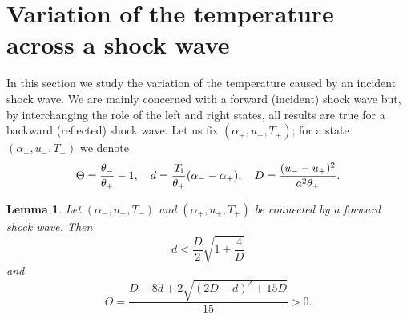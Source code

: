 \documentclass[10pt,a4paper]{article}
\newtheorem{lemma}{Lemma}[section]
\numberwithin{equation}{section}
\newcommand{\Ti}{T_{\rm i}}
\begin{document}
\section{Variation of the temperature across a shock wave}\label{sec:temperature}
In this section we study the variation of the temperature caused by an incident shock wave. We are mainly concerned with a forward (incident) shock wave but, by interchanging the role of the left and right states, all results are true for a backward (reflected) shock wave. Let us fix $(\alpha_+,u_+,T_+)$;
for a state $(\alpha_-,u_-, T_-)$ we denote
\begin{equation}\label{e:ThetaDeltaD}
   \Theta = \frac{\theta_-}{\theta_+} - 1, \quad
   d = \frac{\Ti}{\theta_+}(\alpha_- - \alpha_+), \quad
   D =  \frac{ (u_- - u_+)^2}{a^2\theta_+}.
\end{equation}
%
\begin{lemma}\label{l:Theta>0}
Let $(\alpha_-,u_-,T_-)$ and $(\alpha_+,u_+,T_+)$ be connected by a forward shock wave. Then
\begin{equation}\label{eq:condition Delta}
  d < \frac{D}{2}\sqrt{1 + \frac{4}{D}}
\end{equation}
and 
\begin{equation}\label{eq:Theta2}
     \Theta = \frac{D - 8d + 2\sqrt{(2D - d)^2 + 15D}}{15}>0.
\end{equation}
\end{lemma}
%
\end{document}
